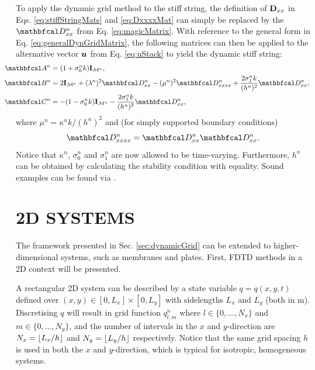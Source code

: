 \documentclass[fleqn]{jaes}
\begin{document}
To apply the dynamic grid method to the stiff string, the definition of $\mathbf{D}_{xx}$ in Eqs. \eqref{eq:stiffStringMats} and \eqref{eq:DxxxxMat} can simply be replaced by the $\DDxx$ from Eq. \eqref{eq:magicMatrix}. With reference to the general form in Eq. \eqref{eq:generalDynGridMatrix}, the following matrices can then be applied to the alternative vector $\boldsymbol{u}$ from Eq. \eqref{eq:uStack} to yield the dynamic stiff string:
\begin{equation}\label{eq:stiffStringDynMatrix}
\begin{aligned}
    \!\!\!\!\!\!\!\!\!\!\AA &= (1 + \sigma_0^nk)\I_{\MoneD},\\
    \!\!\!\!\!\!\!\!\!\!\BB &= 2\I_{\MoneD} + (\lambda^n)^2 \DDxx - (\mu^n)^2 \DDxxxx + \frac{2\sigma_1^nk}{(h^n)^2}\DDxx,\\
    \!\!\!\!\!\!\!\!\!\!\CC &= -(1 - \sigma_0^nk)\I_{\MoneD} - \frac{2\sigma_1^nk}{(h^n)^2}\DDxx,
\end{aligned}
\end{equation}
where $\mu^n = \kappa^n k/(h^n)^2$ and (for simply supported boundary conditions) 
\begin{equation}\label{eq:4thOrder1D}
    \DDxxxx = \DDxx\DDxx.
\end{equation}
Notice that $\kappa^n$, $\sigma_0^n$ and $\sigma_1^n$ are now allowed to be time-varying. Furthermore, $h^n$ can be obtained by calculating the stability condition with equality. %
Sound examples can be found via \cite{soundExamples}.

\section{2D SYSTEMS}\label{sec:2D}
The framework presented in Sec. \ref{sec:dynamicGrid} can be extended to higher-dimensional systems, such as membranes and plates. First, FDTD methods in a 2D context will be presented.

A rectangular 2D system can be described by a state variable $q = q(x,y,t)$ defined over $(x ,y) \in [0, L_x] \times [0, L_y]$ with sidelengths $L_x$ and $L_y$ (both in m). Discretising $q$ will result in grid function $q_{l,m}^n$ where $l \in \{0, \hdots, N_x\}$ and $m \in \{0, \hdots, N_y\}$, and the number of intervals in the $x$ and $y$-direction are $N_x = \floor[L_x/h]$ and $N_y = \floor[L_y/h]$ respectively. Notice that the same grid spacing $h$ is used in both the $x$ and $y$-direction, which is typical for isotropic, homogeneous systems.
\end{document}

